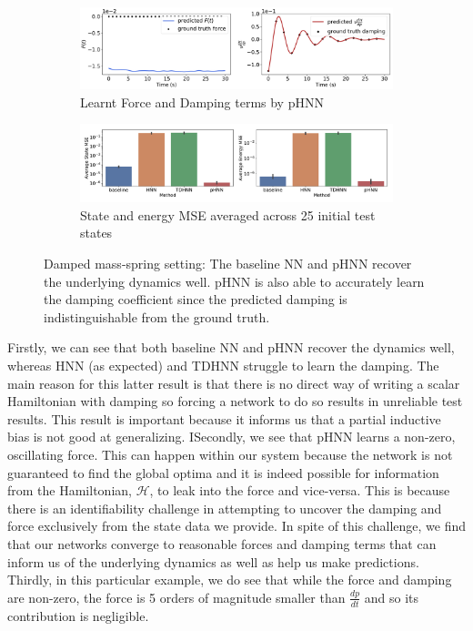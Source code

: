 \documentclass{article}
\begin{document}
\begin{figure}[h!]
\centering
\captionsetup{justification=centering}
	\begin{subfigure}[b]{0.48\textwidth}
		\centering
		\includegraphics[width=\textwidth]{figures/figures/damped/1/damped_dpdt_new_0.pdf}
		\caption{Learnt Force and Damping terms by pHNN}
	\end{subfigure}
	\begin{subfigure}[b]{0.48\textwidth}
	    \centering
		\includegraphics[width=\textwidth]{figures/figures/damped/1/damped_errors_0.pdf}
		\caption{State and energy MSE averaged across 25 initial test states}
	\end{subfigure}
\caption{Damped mass-spring setting: The baseline NN and pHNN recover the underlying dynamics well. pHNN is also able to accurately learn the damping coefficient since the predicted damping is indistinguishable from the ground truth.}
\label{damped}
\end{figure}

Firstly, we can see that both baseline NN and pHNN recover the dynamics well, whereas HNN (as expected) and TDHNN struggle to learn the damping. The main reason for this latter result is that there is no direct way of writing a scalar Hamiltonian with damping so forcing a network to do so results in unreliable test results. This result is important because it informs us that a partial inductive bias is not good at generalizing. ISecondly, we see that pHNN learns a non-zero, oscillating force. This can happen within our system because the network is not guaranteed to find the global optima and it is indeed possible for information from the Hamiltonian, $\mathcal{H}$, to leak into the force and vice-versa. This is because there is an identifiability challenge in attempting to uncover the damping and force exclusively from the state data we provide. In spite of this challenge, we find that our networks converge to reasonable forces and damping terms that can inform us of the underlying dynamics as well as help us make predictions. Thirdly, in this particular example, we do see that while the force and damping are non-zero, the force is 5 orders of magnitude smaller than $\frac{dp}{dt}$ and so its contribution is negligible.
\end{document}
